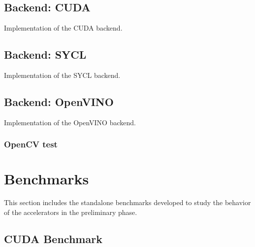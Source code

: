 \subsection{Backend: CUDA}
\label{appcuda}
Implementation of the CUDA backend.



\subsection{Backend: SYCL}
\label{appsycl}
Implementation of the SYCL backend.



\subsection{Backend: OpenVINO}
\label{appopenvino}
Implementation of the OpenVINO backend.



\subsubsection{OpenCV test}
\label{appopencv}


\clearpage
\section{Benchmarks}
\label{appbenchmark}
This section includes the standalone benchmarks developed to study the behavior of the accelerators in the preliminary phase.

\subsection{CUDA Benchmark}
\label{appbenchmarkcuda}


